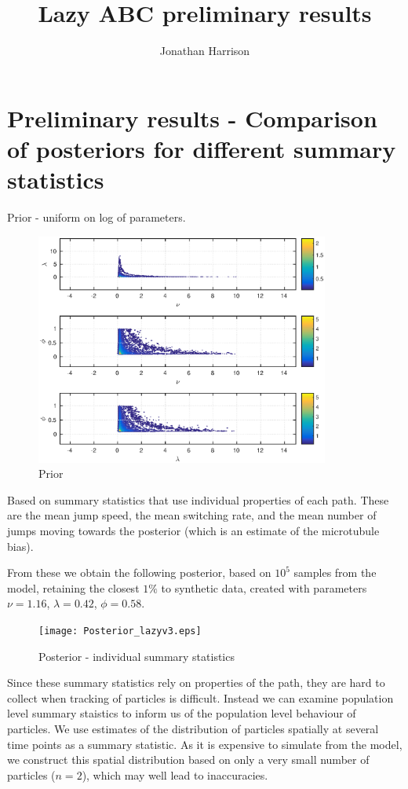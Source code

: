 \documentclass[a4paper,10pt]{article}
\title{Lazy ABC preliminary results}
\author{Jonathan Harrison}
\begin{document}
\maketitle

\section{Preliminary results - Comparison of posteriors for different summary statistics}

Prior - uniform on log of parameters.

\begin{figure}[h!]
\centering
\includegraphics[height=3in]{Prior_lazyv3.eps}
\caption{Prior}
\label{prior}
\end{figure}


Based on summary statistics that use individual properties of each path. These are the mean jump speed, the mean switching rate, and the mean number of jumps moving towards the posterior (which is an estimate of the microtubule bias).

From these we obtain the following posterior, based on $10^5$ samples from the model, retaining the closest $1\%$ to synthetic data, created with parameters  $\nu = 1.16$, $\lambda = 0.42$, $\phi = 0.58$.

\begin{figure}[h!]
\centering
\texttt{[image: Posterior\_lazyv3.eps]}
\caption{Posterior - individual summary statistics}
\label{prior}
\end{figure}

Since these summary statistics rely on properties of the path, they are hard to collect when tracking of particles is difficult.
Instead we can examine population level summary staistics to inform us of the population level behaviour of particles.
We use estimates of the distribution of particles spatially at several time points as a summary statistic. 
As it is expensive to simulate from the model, we construct this spatial distribution based on only a very small number of particles ($n=2$), which may well lead to inaccuracies.
\end{document}
